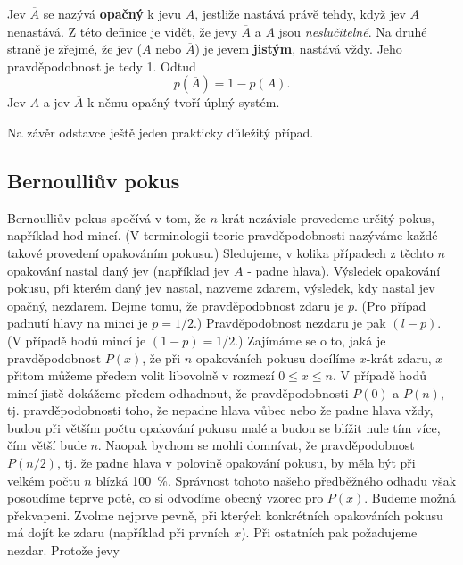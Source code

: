       Jev \(\overline{A}\) se nazývá \textbf{opačný} k jevu \(A\), jestliže nastává právě tehdy, 
      když jev \(A\) nenastává. Z této definice je vidět, že jevy \(\overline{A}\) a \(A\) jsou 
      \emph{neslučitelné}. Na druhé straně je zřejmé, že jev (\(A\) nebo \(\overline{A}\)) je jevem 
      \textbf{jistým}, nastává vždy. Jeho pravděpodobnost je tedy \num{1}. Odtud
      \begin{equation}\label{mai:eq054}
        p(\overline{A}) = 1 - p(A).
      \end{equation}
      Jev \(A\) a jev \(\overline{A}\) k němu opačný tvoří úplný systém.
      
      Na závěr odstavce ještě jeden prakticky důležitý případ.
      
    \subsection{Bernoulliův pokus}\label{mai:IchapIVsecIIssecIV}
      Bernoulliův pokus spočívá v tom, že \(n\)-krát nezávisle provedeme určitý pokus, například hod
      mincí. (V terminologii teorie pravděpodobnosti nazýváme každé takové provedení opakováním
      pokusu.) Sledujeme, v kolika případech z těchto \(n\) opakování nastal daný jev (například jev
      \(A\) - padne hlava). Výsledek opakování pokusu, při kterém daný jev nastal, nazveme zdarem,
      výsledek, kdy nastal jev opačný, nezdarem. Dejme tomu, že pravděpodobnost zdaru je \(p\). (Pro
      případ padnutí hlavy na minci je \(p = 1/2\).) Pravděpodobnost nezdaru je pak \((l - p)\). (V
      případě hodů mincí je \((1 - p) = 1/2\).) Zajímáme se o to, jaká je pravděpodobnost \(P(x)\),
      že při \(n\) opakováních pokusu docílíme \(x\)-krát zdaru, \(x\) přitom můžeme předem volit
      libovolně v rozmezí \(0 \leq x \leq n\). V případě hodů mincí jistě dokážeme předem odhadnout,
      že pravděpodobnosti \(P(0)\) a \(P(n)\), tj. pravděpodobnosti toho, že nepadne hlava vůbec
      nebo že padne hlava vždy, budou při větším počtu opakování pokusu malé a budou se blížit nule
      tím více, čím větší bude \(n\). Naopak bychom se mohli domnívat, že pravděpodobnost
      \(P(n/2)\), tj. že padne hlava v polovině opakování pokusu, by měla být při velkém počtu \(n\)
      blízká \qty{100}{\percent}. Správnost tohoto našeho předběžného odhadu však posoudíme teprve
      poté, co si odvodíme obecný vzorec pro \(P(x)\). Budeme možná překvapeni. Zvolme nejprve
      pevně, při kterých konkrétních opakováních pokusu má dojít ke zdaru  (například při prvních
      \(x\)). Při ostatních pak požadujeme nezdar. Protože jevy
